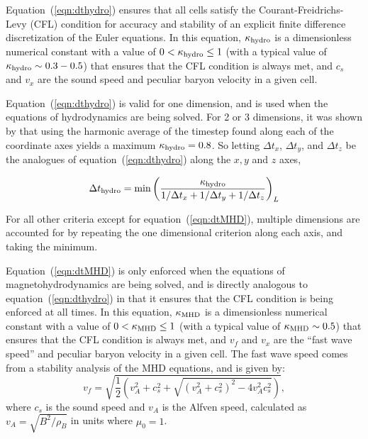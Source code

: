 Equation~(\ref{eqn:dthydro}) ensures that all cells satisfy the
Courant-Freidrichs-Levy (CFL) condition for accuracy and stability of
an explicit finite difference discretization of the Euler equations.
In this equation, $\kappa_{\rm hydro}$ is a dimensionless numerical
constant with a value of $0 < \kappa_{\rm hydro} \leq 1$ (with a
typical value of $\kappa_{\rm hydro} \sim 0.3-0.5$) that ensures that
the CFL condition is always met, and $c_s$ and $v_x$ are the sound
speed and peculiar baryon velocity in a given cell.

Equation~(\ref{eqn:dthydro}) is valid for one dimension, and is used
when the equations of hydrodynamics are being solved.  For 2 or 3
dimensions, it was shown by \cite{Godunov1959} that using the harmonic
average of the timestep found along each of the coordinate axes yields
a maximum $\kappa_{\rm hydro} = 0.8$.  So letting $\Delta t_x$,
$\Delta t_y$, and $\Delta t_z$ be the analogues of
equation~(\ref{eqn:dthydro}) along the $x,y$ and $z$ axes,

\begin{equation}
  \Delta t_{\rm hydro} = \min \left( \frac{\kappa_{\rm hydro}} {1/\Delta t_x
  +1/\Delta t_y + 1/\Delta t_z} \right)_L
\end{equation}

For all other criteria except for equation~(\ref{eqn:dtMHD}), multiple
dimensions are accounted for by repeating the one dimensional
criterion along each axis, and taking the minimum.

Equation~(\ref{eqn:dtMHD}) is only enforced when the equations of
magnetohydrodynamics are being solved, and is directly analogous to
equation~(\ref{eqn:dthydro}) in that it ensures that the CFL condition
is being enforced at all times.  In this equation, $\kappa_{\rm MHD}$
is a dimensionless numerical constant with a value of $0 < \kappa_{\rm
MHD} \leq 1$ (with a typical value of $\kappa_{\rm MHD} \sim 0.5$)
that ensures that the CFL condition is always met, and $v_f$ and $v_x$
are the ``fast wave speed'' and peculiar baryon velocity in a given
cell.  The fast wave speed comes from a stability analysis of the MHD
equations, and is given by:
%
\begin{equation}
v_f = \sqrt{ \frac{1}{2} \left(  v_A^2 + c_s^2 + \sqrt{(v_A^2 +
      c_s^2)^2 - 4 v_A^2 c_s^2}  \right)  },
\label{eqn:vfastmhd}
\end{equation}
%
where $c_s$ is the sound speed and $v_A$ is the Alfven speed,
calculated as $v_A = \sqrt{B^2/\rho_B}$ in units where $\mu_0 = 1$.

